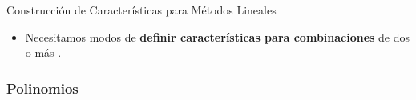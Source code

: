 \documentclass[10pt, envcountsect, handout, aspectratio=1610, hyperref={hypertexnames=true}]{beamer}
\begin{document}
\begin{frame}{Construcción de Características para Métodos Lineales}
\begin{itemize}
\begin{itemize}
\begin{itemize}
						\end{itemize} 
		
		\end{itemize}
		
		\item Necesitamos modos de \textbf{definir características para combinaciones} de dos o más .
		
	\end{itemize}
\end{frame}


\subsubsection{Polinomios}
\end{document}
